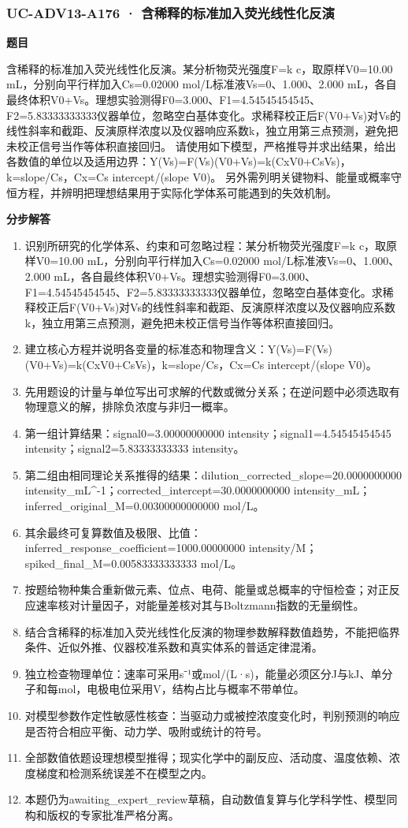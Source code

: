 \documentclass[UTF8,11pt,a4paper]{ctexart}
\begin{document}
\subsubsection*{UC-ADV13-A176 · 含稀释的标准加入荧光线性化反演}
\noindent\textbf{题目}\par
含稀释的标准加入荧光线性化反演。某分析物荧光强度F=k c，取原样V0=10.00 mL，分别向平行样加入Cs=0.02000 mol/L标准液Vs=0、1.000、2.000 mL，各自最终体积V0+Vs。理想实验测得F0=3.000、F1=4.54545454545、F2=5.83333333333仪器单位，忽略空白基体变化。求稀释校正后F(V0+Vs)对Vs的线性斜率和截距、反演原样浓度以及仪器响应系数k，独立用第三点预测，避免把未校正信号当作等体积直接回归。 请使用如下模型，严格推导并求出结果，给出各数值的单位以及适用边界：Y(Vs)=F(Vs)(V0+Vs)=k(CxV0+CsVs)，k=slope/Cs，Cx=Cs intercept/(slope V0)。 另外需列明关键物料、能量或概率守恒方程，并辨明把理想结果用于实际化学体系可能遇到的失效机制。\par
\medskip\noindent\textbf{分步解答}
\begin{enumerate}
\item 识别所研究的化学体系、约束和可忽略过程：某分析物荧光强度F=k c，取原样V0=10.00 mL，分别向平行样加入Cs=0.02000 mol/L标准液Vs=0、1.000、2.000 mL，各自最终体积V0+Vs。理想实验测得F0=3.000、F1=4.54545454545、F2=5.83333333333仪器单位，忽略空白基体变化。求稀释校正后F(V0+Vs)对Vs的线性斜率和截距、反演原样浓度以及仪器响应系数k，独立用第三点预测，避免把未校正信号当作等体积直接回归。
\item 建立核心方程并说明各变量的标准态和物理含义：Y(Vs)=F(Vs)(V0+Vs)=k(CxV0+CsVs)，k=slope/Cs，Cx=Cs intercept/(slope V0)。
\item 先用题设的计量与单位写出可求解的代数或微分关系；在逆问题中必须选取有物理意义的解，排除负浓度与非归一概率。
\item 第一组计算结果：signal0=3.00000000000 intensity；signal1=4.54545454545 intensity；signal2=5.83333333333 intensity。
\item 第二组由相同理论关系推得的结果：dilution\_corrected\_slope=20.0000000000 intensity\_mL\textasciicircum{}-1；corrected\_intercept=30.0000000000 intensity\_mL；inferred\_original\_M=0.00300000000000 mol/L。
\item 其余最终可复算数值及极限、比值：inferred\_response\_coefficient=1000.00000000 intensity/M；spiked\_final\_M=0.00583333333333 mol/L。
\item 按题给物种集合重新做元素、位点、电荷、能量或总概率的守恒检查；对正反应速率核对计量因子，对能量差核对其与Boltzmann指数的无量纲性。
\item 结合含稀释的标准加入荧光线性化反演的物理参数解释数值趋势，不能把临界条件、近似外推、仪器校准系数和真实体系的普适定律混淆。
\item 独立检查物理单位：速率可采用s⁻¹或mol/(L·s)，能量必须区分J与kJ、单分子和每mol，电极电位采用V，结构占比与概率不带单位。
\item 对模型参数作定性敏感性核查：当驱动力或被控浓度变化时，判别预测的响应是否符合相应平衡、动力学、吸附或统计的符号。
\item 全部数值依题设理想模型推得；现实化学中的副反应、活动度、温度依赖、浓度梯度和检测系统误差不在模型之内。
\item 本题仍为awaiting\_expert\_review草稿，自动数值复算与化学科学性、模型同构和版权的专家批准严格分离。
\end{enumerate}
\end{document}
